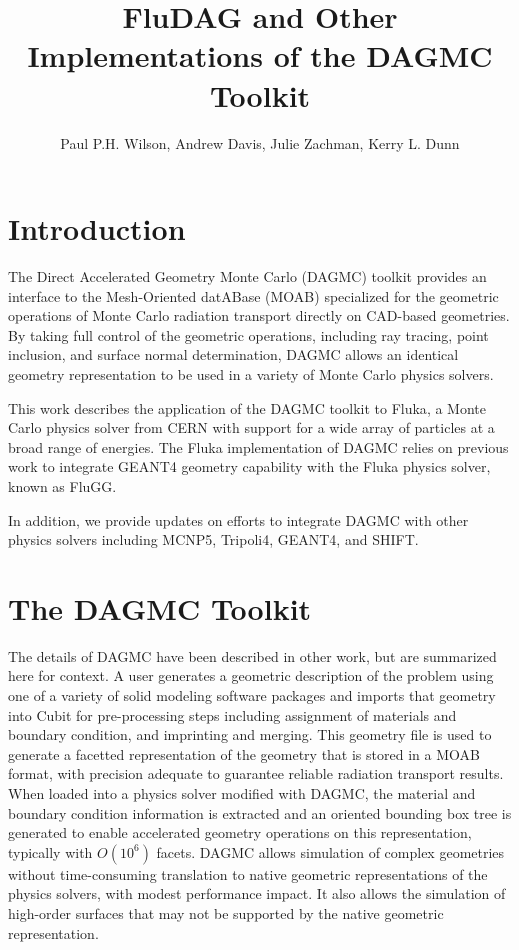 \documentclass{anstrans}
\title{FluDAG and Other Implementations of the DAGMC Toolkit}
\author{Paul P.H. Wilson, Andrew Davis, Julie Zachman, Kerry L. Dunn}
\institute{University of Wisconsin-Madison, 1500 Engineering Dr,
  Madison, WI 53706}
\begin{document}
\section{Introduction}

The Direct Accelerated Geometry Monte Carlo (DAGMC) toolkit provides
an interface to the Mesh-Oriented datABase (MOAB)\cite{MOAB} specialized for the
geometric operations of Monte Carlo radiation transport directly on
CAD-based geometries.  By taking full control of the geometric
operations, including ray tracing, point inclusion, and surface
normal determination, DAGMC allows an identical geometry representation to be
used in a variety of Monte Carlo physics solvers.

This work describes the application of the DAGMC toolkit to
Fluka\cite{fluka}, a Monte Carlo physics solver from CERN with support
for a wide array of particles at a broad range of energies.  The Fluka
implementation of DAGMC relies on previous work to integrate
GEANT4\cite{GEANT4} geometry capability with the Fluka physics solver,
known as FluGG\cite{flugg}.

In addition, we provide updates on efforts to integrate DAGMC with
other physics solvers including MCNP5\cite{mcnp5},
Tripoli4\cite{tripoli}, GEANT4, and SHIFT\cite{shift}.

\section{The DAGMC Toolkit}

The details of DAGMC have been described in other work\cite{dagmc}, but are
summarized here for context.  A user generates a geometric description
of the problem using one of a variety of solid modeling software
packages and imports that geometry into Cubit\cite{cubit} for
pre-processing steps including assignment of materials and boundary
condition, and imprinting and merging.  This geometry file is used to
generate a facetted representation of the geometry that is stored in a
MOAB format, with precision adequate to guarantee reliable radiation
transport results\cite{snouffer_ans}.  When loaded into a physics solver
modified with DAGMC, the material and boundary condition information
is extracted and an oriented bounding box tree is generated to enable
accelerated geometry operations on this representation, typically with $O(10^6)$
facets.  DAGMC allows simulation of complex geometries without
time-consuming translation to native geometric representations of the
physics solvers, with modest performance impact.  It also allows the
simulation of high-order surfaces that may not be supported by the
native geometric representation.
\end{document}
